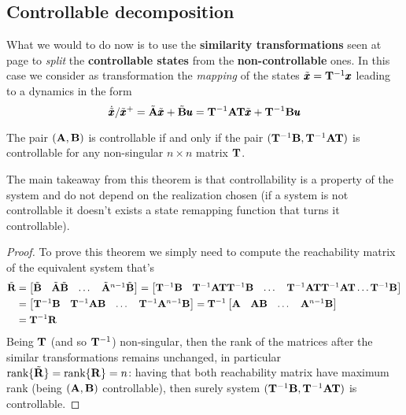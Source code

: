 \subsection{Controllable decomposition}
	What we would to do now is to use the \textbf{similarity transformations} seen at page \pageref{eq:dynsys:algebraicequivalence} to \textit{split} the \textbf{controllable states} from the \textbf{non-controllable} ones. In this case we consider as transformation the \textit{mapping} of the states $\tilde {\pmb{x}} = \mathbf{T}^{-1} \pmb{x}$ leading to a dynamics in the form
	\[ \dot{\tilde{\pmb{x}}}/\tilde{\pmb{x}}^+ = \tilde {\mathbf{A}} \tilde{\pmb{x}} + \tilde {\mathbf{B}} \pmb{u} = \mathbf{T}^{-1}\mathbf{A}\mathbf{T}\tilde {\pmb{x}} + \mathbf{T}^{-1}\mathbf{B}\pmb{u}\]
	\begin{theorem}
		The pair $(\mathbf{A},\mathbf{B})$ is controllable if and only if the pair $(\mathbf{T}^{-1}\mathbf{B}, \mathbf{T}^{-1}\mathbf{A}\mathbf{T})$ is controllable for any non-singular $n\times n$ matrix $\mathbf{T}$.
	\end{theorem}
	The main takeaway from this theorem is that controllability is a property of the system and do not depend on the realization chosen (if a system is not controllable it doesn't exists a state remapping function that turns it controllable).
	\begin{proof}
		To prove this theorem we simply need to compute the reachability matrix of the equivalent system that's
		\begin{align*}
			\tilde {\mathbf{R}} & = \begin{bmatrix} \tilde {\mathbf{B}} & \tilde {\mathbf{A}}\tilde{\mathbf{B}} &\dots & \tilde {\mathbf{A}}^{n-1}\tilde {\mathbf{B}} \end{bmatrix} = \begin{bmatrix} \mathbf{T}^{-1} \mathbf{B} & \mathbf{T}^{-1}  \mathbf{A}\mathbf{T}\mathbf{T}^{-1} \mathbf{B} & \dots & \mathbf{T}^{-1} \mathbf{A} \mathbf{T} \mathbf{T}^{-1} \mathbf{A} \mathbf{T} \dots \mathbf{T}^{-1}  \mathbf{B}   \end{bmatrix} \\
			& = \begin{bmatrix} \mathbf{T}^{-1} \mathbf{B} & \mathbf{T}^{-1}  \mathbf{A}\mathbf{B} & \dots & \mathbf{T}^{-1}  \mathbf{A}^{n-1}\mathbf{B}  \end{bmatrix} = \mathbf{T}^{-1}\begin{bmatrix} \mathbf{A} & \mathbf{A}\mathbf{B} & \dots & \mathbf{A}^{n-1}\mathbf{B} \end{bmatrix} \\
			& = \mathbf{T}^{-1} \mathbf{R}
		\end{align*}
		Being $\mathbf{T}$ (and so $\mathbf{T}^{-1}$) non-singular, then the rank of the matrices after the similar transformations remains unchanged, in particular $\textrm{rank}\{\tilde {\mathbf{R}}\} = \textrm{rank}\{\mathbf{R}\}= n$: having that both reachability matrix have maximum rank (being $(\mathbf{A},\mathbf{B})$ controllable), then surely system $(\mathbf{T}^{-1}\mathbf{B}, \mathbf{T}^{-1}\mathbf{A}\mathbf{T})$ is controllable. 
	\end{proof}

